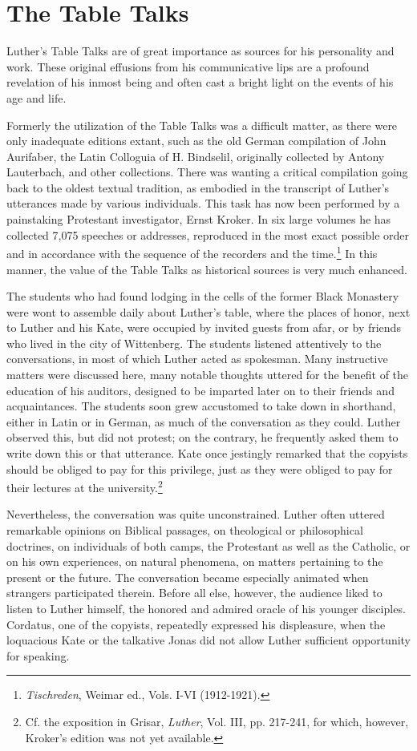 \section{The Table Talks}

Luther’s Table Talks are of great importance as sources for his
personality and work. These original effusions from his communicative
lips are a profound revelation of his inmost being and often cast a
bright light on the events of his age and life.

Formerly the utilization of the Table Talks was a difficult matter,
as there were only inadequate editions extant, such as the old German
compilation of John Aurifaber, the Latin Colloguia of H. Bindselil,
originally collected by Antony Lauterbach, and other collections.
There was wanting a critical compilation going back to the oldest
textual tradition, as embodied in the transcript of Luther’s utterances
made by various individuals. This task has now been performed by a
painstaking Protestant investigator, Ernst Kroker. In six large volumes
he has collected 7,075 speeches or addresses, reproduced in the
most exact possible order and in accordance with the sequence of the
recorders and the time.\footnote{\textit{Tischreden}, Weimar ed., Vols. I-VI (1912-1921).}
 In this manner, the value of the Table Talks
as historical sources is very much enhanced.

The students who had found lodging in the cells of the former
Black Monastery were wont to assemble daily about Luther’s table,
where the places of honor, next to Luther and his Kate, were occupied
by invited guests from afar, or by friends who lived in the city
of Wittenberg. The students listened attentively to the conversations,
in most of which Luther acted as spokesman. Many instructive matters
were discussed here, many notable thoughts uttered for the benefit of
the education of his auditors, designed to be imparted later on to
their friends and acquaintances. The students soon grew accustomed
to take down in shorthand, either in Latin or in German, as much
of the conversation as they could. Luther observed this, but did not
protest; on the contrary, he frequently asked them to write down
this or that utterance. Kate once jestingly remarked that the copyists
should be obliged to pay for this privilege, just as they were obliged
to pay for their lectures at the university.\footnote
{Cf. the exposition in Grisar, \textit{Luther}, Vol. III, pp. 217-241, for which, however,
Kroker’s edition was not yet available.}

Nevertheless, the conversation was quite unconstrained. Luther
often uttered remarkable opinions on Biblical passages, on theological
or philosophical doctrines, on individuals of both camps, the Protestant
as well as the Catholic, or on his own experiences, on natural
phenomena, on matters pertaining to the present or the future. The
conversation became especially animated when strangers participated
therein. Before all else, however, the audience liked to listen to Luther
himself, the honored and admired oracle of his younger disciples.
Cordatus, one of the copyists, repeatedly expressed his displeasure,
when the loquacious Kate or the talkative Jonas did not allow Luther
sufficient opportunity for speaking.

